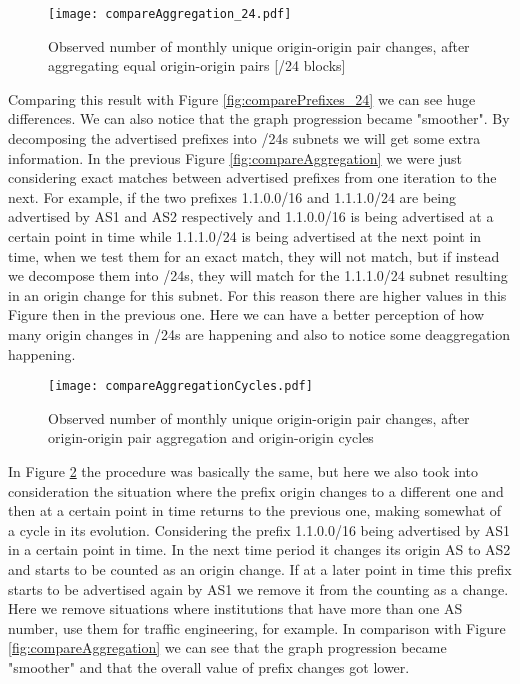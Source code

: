 \documentclass[11pt,a4paper]{scrreprt}
\begin{document}
\begin{figure}[!h]
\centering
\texttt{[image: compareAggregation\_24.pdf]}
\caption{Observed number of monthly
unique origin-origin pair changes, after aggregating equal origin-origin pairs [/24 blocks]}
\label{fig:compareAggregation24}
\end{figure}



Comparing this result with Figure \ref{fig:comparePrefixes_24} we can see huge differences. We can also notice that the graph progression became "smoother". By decomposing the advertised prefixes into /24s subnets we will get some extra information. In the previous Figure \ref{fig:compareAggregation} we were just considering exact matches between advertised prefixes from one iteration to the next. For example, if the two prefixes 1.1.0.0/16 and 1.1.1.0/24 are being advertised by AS1 and AS2 respectively and 1.1.0.0/16 is being advertised at a certain point in time while 1.1.1.0/24 is being advertised at the next point in time, when we test them for an exact match, they will not match, but if instead we decompose them into /24s, they will match for the 1.1.1.0/24 subnet resulting in an origin change for this subnet. For this reason there are higher values in this Figure then in the previous one. Here we can have a better perception of how many origin changes in /24s are happening and also to notice some deaggregation happening.  



\begin{figure}[!h]
\centering
\texttt{[image: compareAggregationCycles.pdf]}
\caption{Observed number of monthly
unique origin-origin pair changes, after origin-origin pair aggregation and origin-origin cycles}
\label{fig:compareAggregationCycles}
\end{figure}

In Figure \ref{fig:compareAggregationCycles} the procedure was basically the same, but here we also took into consideration the situation where the prefix origin changes to a different one and then at a certain point in time returns to the previous one, making somewhat of a cycle in its evolution. Considering the prefix 1.1.0.0/16 being advertised by AS1 in a certain point in time. In the next time period it changes its origin AS to AS2 and starts to be counted as an origin change. If at a later point in time this prefix starts to be advertised again by AS1 we remove it from the counting as a change. Here we remove situations where institutions that have more than one AS number, use them for traffic engineering, for example.  In comparison with Figure \ref{fig:compareAggregation} we can see that the graph progression became "smoother" and that the overall value of prefix changes got lower.
\end{document}
